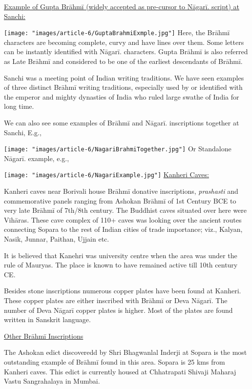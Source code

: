\underline{Example of Gupta Brāhmī (widely accepted as pre-cursor to Nāgarī. script) at Sanchi:}

\texttt{[image: "images/article-6/GuptaBrahmiExmple.jpg"]}
Here, the Brāhmī characters are becoming complete, curvy and have lines over them. Some letters can be instantly identified with Nāgarī. characters. Gupta Brāhmī is also referred as Late Brāhmī and considered to be one of the earliest descendants of Brāhmī.

Sanchi was a meeting point of Indian writing traditions. We have seen examples of three distinct Brāhmī writing traditions, especially used by or identified with the emperor and mighty dynasties of India who ruled large swathe of India for long time.

We can also see some examples of Brāhmī and Nāgarī. inscriptions together at Sanchi, E.g.,

\texttt{[image: "images/article-6/NagariBrahmiTogether.jpg"]}
Or Standalone Nāgarī. example, e.g.,

\texttt{[image: "images/article-6/NagariExample.jpg"]}
\underline{Kanheri Caves:}

Kanheri caves near Borivali house Brāhmī donative inscriptions, \textit{prashasti} and commemorative panels ranging from Ashokan Brāhmī of 1st Century BCE to very late Brāhmī of 7th/8th century. The Buddhist caves situated over here were Vihāras. These cave complex of 110+ caves was looking over the ancient routes connecting Sopara to the rest of Indian cities of trade importance; viz., Kalyan, Nasik, Junnar, Paithan, Ujjain etc.

It is believed that Kanehri was university centre when the area was under the rule of Mauryas. The place is known to have remained active till 10th century CE.

Besides stone inscriptions numerous copper plates have been found at Kanheri. These copper plates are either inscribed with Brāhmī or Deva Nāgarī. The number of Deva Nāgarī copper plates is higher. Most of the plates are found written in Sanskrit language. 

\underline{Other Brāhmī Inscriptions}

The Ashokan edict discoveredd by Shri Bhagwanlal Inderji at Sopara is the most outstanding example of Brāhmī found in this area. Sopara is 25 kms from Kanheri caves. This edict is currently housed at Chhatrapati Shivaji Maharaj Vastu Sangrahalaya in Mumbai.

